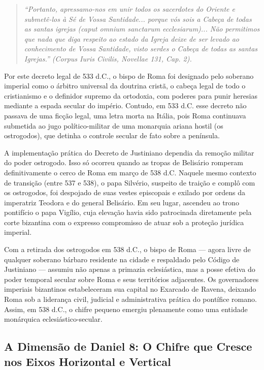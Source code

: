 \documentclass[11pt,a4paper,openany]{book}
\begin{document}
\begin{quote}
\itshape ``Portanto, apressamo-nos em unir todos os sacerdotes do Oriente e submetê-los à Sé de Vossa Santidade... porque vós sois a Cabeça de todas as santas igrejas (\textit{caput omnium sanctarum ecclesiarum})... Não permitimos que nada que diga respeito ao estado da Igreja deixe de ser levado ao conhecimento de Vossa Santidade, visto serdes o Cabeça de todas as santas Igrejas.'' (\textit{Corpus Iuris Civilis}, Novellae 131, Cap. 2).
\end{quote}


Por este decreto legal de 533 d.C., o bispo de Roma foi designado pelo soberano imperial como o árbitro universal da doutrina cristã, o cabeça legal de todo o cristianismo e o definidor supremo da ortodoxia, com poderes para punir heresias mediante a espada secular do império. Contudo, em 533 d.C. esse decreto não passava de uma ficção legal, uma letra morta na Itália, pois Roma continuava submetida ao jugo político-militar de uma monarquia ariana hostil (os ostrogodos), que detinha o controle secular de fato sobre a península.

A implementação prática do Decreto de Justiniano dependia da remoção militar do poder ostrogodo. Isso só ocorreu quando as tropas de Belisário romperam definitivamente o cerco de Roma em março de 538 d.C. Naquele mesmo contexto de transição (entre 537 e 538), o papa Silvério, suspeito de traição e complô com os ostrogodos, foi despojado de suas vestes episcopais e exilado por ordens da imperatriz Teodora e do general Belisário. Em seu lugar, ascendeu ao trono pontifício o papa Vigílio, cuja elevação havia sido patrocinada diretamente pela corte bizantina com o expresso compromisso de atuar sob a proteção jurídica imperial.

Com a retirada dos ostrogodos em 538 d.C., o bispo de Roma — agora livre de qualquer soberano bárbaro residente na cidade e respaldado pelo Código de Justiniano — assumiu não apenas a primazia eclesiástica, mas a posse efetiva do poder temporal secular sobre Roma e seus territórios adjacentes. Os governadores imperiais bizantinos estabeleceram sua capital no Exarcado de Ravena, deixando Roma sob a liderança civil, judicial e administrativa prática do pontífice romano. Assim, em 538 d.C., o chifre pequeno emergiu plenamente como uma entidade monárquica eclesiástico-secular.



\subsection{A Dimensão de Daniel 8: O Chifre que Cresce nos Eixos Horizontal e Vertical}
\end{document}
